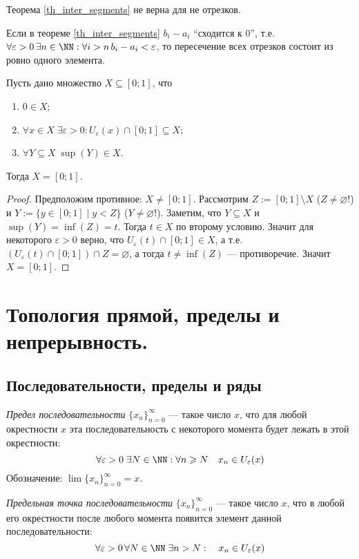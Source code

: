 \documentclass[12pt,a4paper]{article}
\begin{document}
    \begin{remark}
        Теорема \ref{th_inter_segments} не верна для не отрезков.
    \end{remark}

    \begin{remark}
        Если в теореме \ref{th_inter_segments} $b_i-a_i$ ``сходится к 0'', т.е. $\forall \varepsilon > 0\, \exists n\in\NN: \forall i > n\, b_i-a_i < \varepsilon$, то пересечение всех отрезков состоит из ровно одного элемента.
    \end{remark}

    \begin{theorem}
        Пусть дано множество $X \subseteq [0;1]$, что
        \begin{enumerate}
            \item $0 \in X$;
            \item $\forall x \in X\; \exists \varepsilon > 0: U_\varepsilon(x) \cap [0;1] \subseteq X$;
            \item $\forall Y \subseteq X\; \sup(Y) \in X$.
        \end{enumerate}
        Тогда $X = [0;1]$.
    \end{theorem}

    \begin{proof}
        Предположим противное: $X \neq [0;1]$. Рассмотрим $Z := [0;1] \setminus X$ ($Z \neq \varnothing$!) и $Y := \{y \in [0;1] \mid y < Z\}$ ($Y \neq \varnothing$!). Заметим, что $Y \subseteq X$ и $\sup(Y) = \inf(Z) = t$. Тогда $t \in X$ по второму условию. Значит для некоторого $\varepsilon > 0$ верно, что $U_{\varepsilon}(t) \cap [0;1] \in X$, а т.е. $(U_\varepsilon(t) \cap [0;1]) \cap Z = \varnothing$, а тогда $t \neq \inf(Z)$ --- противоречие. Значит $X = [0;1]$.
    \end{proof}

    \section{Топология прямой, пределы и непрерывность.}

    \subsection{Последовательности, пределы и ряды}

    \begin{definition}
        \emph{Предел последовательности} $\{x_n\}_{n=0}^\infty$ --- такое число $x$, что для любой окрестности $x$ эта последовательность с некоторого момента будет лежать в этой окрестности:
        \[\forall \varepsilon > 0\; \exists N \in \NN: \forall n \geqslant N\quad x_n \in U_\varepsilon(x)\]
        Обозначение: $\lim \{x_n\}_{n=0}^\infty = x$.

        \emph{Предельная точка последовательности} $\{x_n\}_{n=0}^\infty$ --- такое число $x$, что в любой его окрестности после любого момента появится элемент данной последовательности:
        \[\forall \varepsilon > 0\, \forall N \in \NN\; \exists n > N: \quad x_n \in U_\varepsilon(x)\]
    \end{definition}
\end{document}
